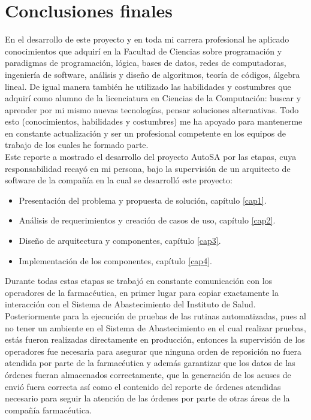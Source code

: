 \section{Conclusiones finales}
En el desarrollo de este proyecto y en toda mi carrera profesional he aplicado conocimientos que adquirí en la Facultad de Ciencias sobre programación y paradigmas de programación, lógica, bases de datos, redes de computadoras, ingeniería de software, análisis y diseño de algoritmos, teoría de códigos, álgebra lineal. De igual manera también he utilizado las habilidades y costumbres que adquirí como alumno de la licenciatura en Ciencias de la Computación: buscar y aprender por mi mismo nuevas tecnologías, pensar soluciones alternativas. Todo esto (conocimientos, habilidades y costumbres) me ha apoyado para mantenerme en constante actualización y ser un profesional competente en los equipos de trabajo de los cuales he formado parte.\\
Este reporte a mostrado el desarrollo del proyecto AutoSA por las etapas, cuya responsabilidad recayó en mi persona, bajo la supervisión de un arquitecto de software de la compañía en la cual se desarrolló este proyecto:
\begin{itemize}
 	\item Presentación del problema y propuesta de solución, capítulo \ref{cap1}. 
 	\item Análisis de requerimientos y creación de casos de uso, capítulo \ref{cap2}.
 	\item Diseño de arquitectura y componentes, capítulo \ref{cap3}.
 	\item Implementación de los componentes, capítulo \ref{cap4}.
\end{itemize} 
Durante todas estas etapas se trabajó en constante comunicación con los operadores de la farmacéutica, en primer lugar para copiar exactamente la interacción con el Sistema de Abastecimiento del Instituto de Salud. Posteriormente para la ejecución de pruebas de las rutinas automatizadas, pues al no tener un ambiente en el Sistema de Abastecimiento en el cual realizar pruebas, estás fueron realizadas directamente en producción, entonces la supervisión de los operadores fue necesaria para asegurar que ninguna orden de reposición no fuera atendida por parte de la farmacéutica y además garantizar que los datos de las órdenes fueran almacenados correctamente, que la generación de los acuses de envió fuera correcta así como el contenido del reporte de órdenes atendidas necesario para seguir la atención de las órdenes por parte de otras áreas de la compañía farmacéutica.\\

